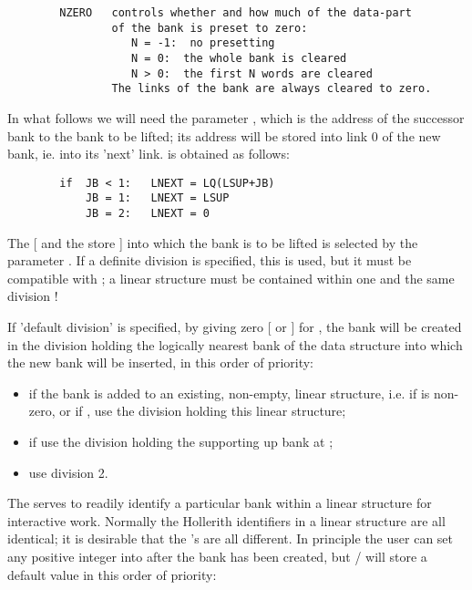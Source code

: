 \begin{verbatim}
        NZERO   controls whether and how much of the data-part
                of the bank is preset to zero:
                   N = -1:  no presetting
                   N = 0:  the whole bank is cleared
                   N > 0:  the first N words are cleared
                The links of the bank are always cleared to zero.
\end{verbatim} 
In what follows we will need the parameter ,
which is the address of the successor bank to the bank to be lifted;
its address will be stored into link 0 of the new bank,
ie. into its 'next' link.
 is obtained as follows:
\begin{verbatim}
        if  JB < 1:   LNEXT = LQ(LSUP+JB)
            JB = 1:   LNEXT = LSUP
            JB = 2:   LNEXT = 0
\end{verbatim} 
The  [ and the store ] into which the bank
is to be lifted is selected by the parameter .
If a definite division is specified, this is used,
but it must be compatible with ;
a linear structure must be contained within one and the same
division !

If 'default division' is specified,
by giving zero [ or  ] for ,
the bank will be created in the division holding the logically
nearest bank of the data structure into which the new bank
will be inserted, in this order of priority:

\begin{itemize}
\item if the bank is added to an existing, non-empty, linear structure,
      i.e. if  is non-zero, or if ,
      use the division holding this linear structure;
\item if  use the division holding the supporting up bank at ;
\item use division 2.
\end{itemize}

The   serves to readily identify
a particular bank within a linear structure for interactive work.
Normally the Hollerith identifiers  in a linear structure are
all identical;
it is desirable that the 's are all different.
In principle the user can set any positive integer into  after
the bank has been created, but / will store a default
value in this order of priority:

